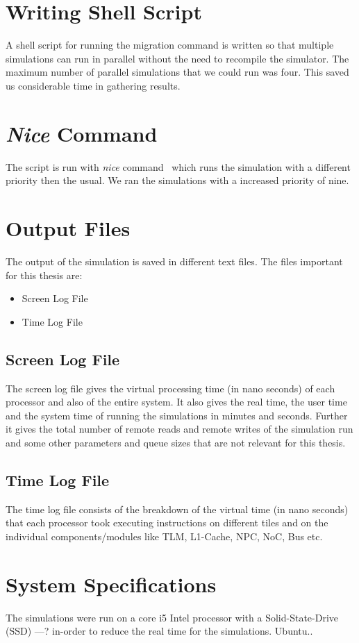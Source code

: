 \documentclass{listhesis}
\begin{document}
\section{Writing Shell Script}
A shell script for running the migration command is written so that multiple simulations can run in parallel without the need to recompile the simulator. The maximum number of parallel simulations that we could run was four. This saved us considerable time in gathering results. 
\section{\textit{Nice} Command}
The script is run with \textit{nice} command~\cite{nice} which runs the simulation with a different priority then the usual. We ran the simulations with a increased priority of nine.
\section{Output Files}
The output of the simulation is saved in different text files. The files important for this thesis are:
\begin{itemize}
\item Screen Log File
\item Time Log File
\end{itemize}
\subsection{Screen Log File}
The screen log file gives the virtual processing time (in nano seconds) of each processor and also of the entire system. It also gives the real time, the user time and the system time of running the simulations in minutes and seconds. Further it gives the total number of remote reads and remote writes of the simulation run and some other parameters and queue sizes that are not relevant for this thesis.\\
\subsection{Time Log File}
The time log file consists of the breakdown of the virtual time (in nano seconds) that each processor took executing instructions on different tiles and on the individual components/modules like TLM, L1-Cache, NPC, NoC, Bus etc.
\section{System Specifications}
The simulations were run on a core i5 Intel processor with a Solid-State-Drive (SSD) ---? in-order to reduce the real time for the simulations. Ubuntu..
\end{document}
